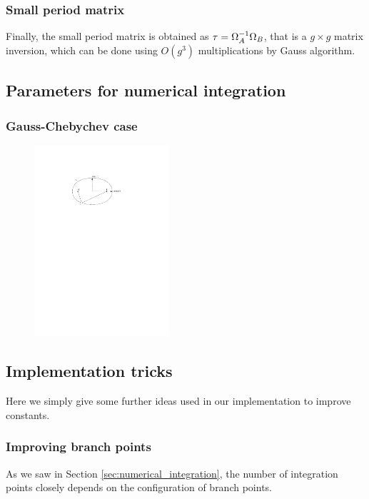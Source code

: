 \documentclass[main.tex]{subfiles}
\begin{document}
   \subsubsection{Small period matrix}

   Finally, the small period matrix is obtained as $\tau=\Omega_A^{-1}\Omega_B$,
   that is a $g\times g$ matrix inversion, which can be done using
   $O(g^3)$ multiplications by Gauss algorithm.

 \subsection{Parameters for numerical integration}

  \subsubsection{Gauss-Chebychev case}

  \begin{figure}
      \includegraphics[width=5cm]{images/ellipse.pdf}
  \end{figure}


   \subsection{Implementation tricks}

   Here we simply give some further ideas used in our implementation to improve constants.

   \subsubsection{Improving branch points}

   As we saw in Section \ref{sec:numerical_integration}, the number of integration points
   closely depends on the configuration of branch points.
\end{document}
